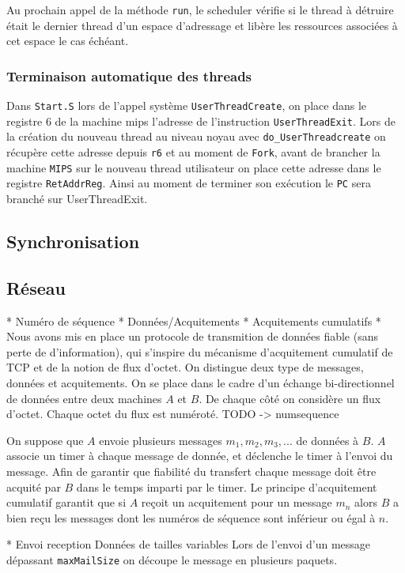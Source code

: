 \documentclass[11pt]{article}
\begin{document}
Au prochain appel de la méthode \texttt{run}, le scheduler vérifie si le thread à détruire était le dernier
thread d'un espace d'adressage et libère les ressources associées à cet espace le cas échéant.

\subsubsection{Terminaison automatique des threads}
Dans \texttt{Start.S} lors de l'appel système \texttt{UserThreadCreate}, on place dans le registre 6 de la machine mips l'adresse de l'instruction \texttt{UserThreadExit}.
Lors de la création du nouveau thread au niveau noyau avec \texttt{do\_UserThreadcreate} on récupère
cette adresse depuis \texttt{r6} et au moment de \texttt{Fork}, avant de brancher la machine \texttt{MIPS} sur
le nouveau thread utilisateur on place cette adresse dans le registre \texttt{RetAddrReg}. Ainsi au moment de terminer son exécution le \texttt{PC} sera branché sur UserThreadExit.

\subsection{Synchronisation}

\subsection{Réseau}
* Numéro de séquence
* Données/Acquitements
* Acquitements cumulatifs
* 
Nous avons mis en place un protocole de transmition de données fiable (sans perte de d'information), qui s'inspire du mécanisme d'acquitement cumulatif de TCP et de la notion de flux d'octet. 
On distingue deux type de messages, données et acquitements. On se place dans le cadre d'un échange bi-directionnel de données entre deux machines $A$ et $B$.
De chaque côté on considère un flux d'octet. Chaque octet du flux est numéroté. TODO -> numsequence

On suppose que $A$ envoie plusieurs messages $m_1, m_2, m_3, ... $ de données à $B$.
$A$ associe un timer à chaque message de donnée, et déclenche le timer à l'envoi du message.
Afin de garantir que fiabilité du transfert chaque message doit être acquité par $B$ dans le temps imparti par le timer. Le principe d'acquitement cumulatif garantit que si $A$ reçoit un acquitement pour un message $m_n$ alors $B$ a bien reçu les messages dont les numéros de séquence sont inférieur ou égal à $n$.

* Envoi reception Données de tailles variables
Lors de l'envoi d'un message dépassant \texttt{maxMailSize} on découpe le message en plusieurs paquets.
\end{document}
